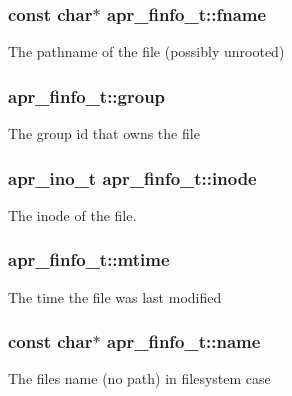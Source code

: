 \subsubsection[{\texorpdfstring{fname}{fname}}]{\setlength{\rightskip}{0pt plus 5cm}const char$\ast$ apr\+\_\+finfo\+\_\+t\+::fname}\hypertarget{structapr__finfo__t_acfed83ab2943ee7a58a215aa1cfd9e47}{}\label{structapr__finfo__t_acfed83ab2943ee7a58a215aa1cfd9e47}
The pathname of the file (possibly unrooted) 
\subsubsection[{\texorpdfstring{group}{group}}]{ apr\+\_\+finfo\+\_\+t\+::group}\hypertarget{structapr__finfo__t_a15c9c056330308de4dafb3826a9b02bc}{}\label{structapr__finfo__t_a15c9c056330308de4dafb3826a9b02bc}
The group id that owns the file 
\subsubsection[{\texorpdfstring{inode}{inode}}]{\setlength{\rightskip}{0pt plus 5cm}apr\+\_\+ino\+\_\+t apr\+\_\+finfo\+\_\+t\+::inode}\hypertarget{structapr__finfo__t_a73aebb666ddc391d53a871802c27eed6}{}\label{structapr__finfo__t_a73aebb666ddc391d53a871802c27eed6}
The inode of the file. 
\subsubsection[{\texorpdfstring{mtime}{mtime}}]{ apr\+\_\+finfo\+\_\+t\+::mtime}\hypertarget{structapr__finfo__t_afc3bec0f6b3b10160428ba5602a41c60}{}\label{structapr__finfo__t_afc3bec0f6b3b10160428ba5602a41c60}
The time the file was last modified 
\subsubsection[{\texorpdfstring{name}{name}}]{\setlength{\rightskip}{0pt plus 5cm}const char$\ast$ apr\+\_\+finfo\+\_\+t\+::name}\hypertarget{structapr__finfo__t_a2915f9141ea76ae3672ccf9eb0fa77bb}{}\label{structapr__finfo__t_a2915f9141ea76ae3672ccf9eb0fa77bb}
The file\textquotesingle{}s name (no path) in filesystem case 
